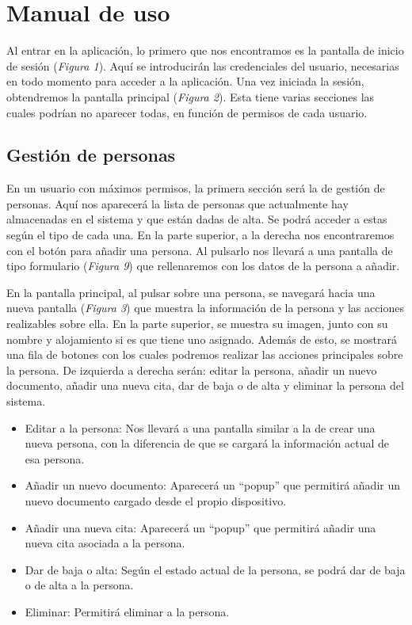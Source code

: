 \section{Manual de uso}

Al entrar en la aplicación, lo primero que nos encontramos es la pantalla de inicio de sesión (\textit{Figura 1}). Aquí se introducirán las credenciales del usuario, necesarias en todo momento para acceder a la aplicación. Una vez iniciada la sesión, obtendremos la pantalla principal (\textit{Figura 2}). Esta tiene varias secciones las cuales podrían no aparecer todas, en función de permisos de cada usuario. 

\subsection{Gestión de personas}

En un usuario con máximos permisos, la primera sección será la de gestión de personas. Aquí nos aparecerá la lista de personas que actualmente hay almacenadas en el sistema y que están dadas de alta. Se podrá acceder a estas según el tipo de cada una. En la parte superior, a la derecha nos encontraremos con el botón para añadir una persona. Al pulsarlo nos llevará a una pantalla de tipo formulario (\textit{Figura 9}) que rellenaremos con los datos de la persona a añadir. 

En la pantalla principal, al pulsar sobre una persona, se navegará hacia una nueva pantalla (\textit{Figura 3}) que muestra la información de la persona y las acciones realizables sobre ella. En la parte superior, se muestra su imagen, junto con su nombre y alojamiento si es que tiene uno asignado. Además de esto, se mostrará una fila de botones con los cuales podremos realizar las acciones principales sobre la persona. De izquierda a derecha serán: editar la persona, añadir un nuevo documento, añadir una nueva cita, dar de baja o de alta y eliminar la persona del sistema. 

\begin{itemize}
    \item Editar a la persona: Nos llevará a una pantalla similar a la de crear una nueva persona, con la diferencia de que se cargará la información actual de esa persona.
    \item Añadir un nuevo documento: Aparecerá un ``popup'' que permitirá añadir un nuevo documento cargado desde el propio dispositivo.
    \item Añadir una nueva cita: Aparecerá un ``popup'' que permitirá añadir una nueva cita asociada a la persona.
    \item Dar de baja o alta: Según el estado actual de la persona, se podrá dar de baja o de alta a la persona.
    \item Eliminar: Permitirá eliminar a la persona.
\end{itemize}

